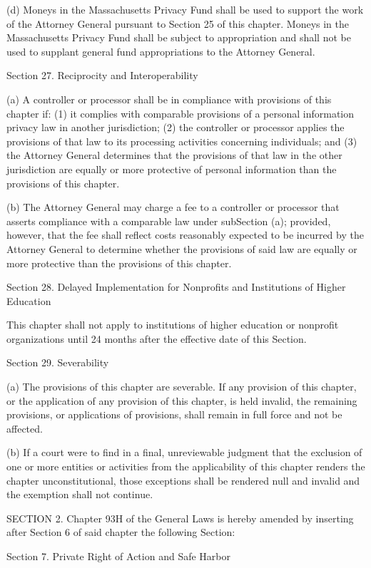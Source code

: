 (d) Moneys in the Massachusetts Privacy Fund shall be used to support the work of the Attorney General pursuant to Section 25 of this chapter. Moneys in the Massachusetts Privacy Fund shall be subject to appropriation and shall not be used to supplant general fund appropriations to the Attorney General.

Section 27. Reciprocity and Interoperability

(a) A controller or processor shall be in compliance with provisions of this chapter if: (1) it complies with comparable provisions of a personal information privacy law in another jurisdiction; (2) the controller or processor applies the provisions of that law to its processing activities concerning individuals; and (3) the Attorney General determines that the provisions of that law in the other jurisdiction are equally or more protective of personal information than the provisions of this chapter.

(b) The Attorney General may charge a fee to a controller or processor that asserts compliance with a comparable law under subSection (a); provided, however, that the fee shall reflect costs reasonably expected to be incurred by the Attorney General to determine whether the provisions of said law are equally or more protective than the provisions of this chapter.

Section 28. Delayed Implementation for Nonprofits and Institutions of Higher Education

This chapter shall not apply to institutions of higher education or nonprofit organizations until 24 months after the effective date of this Section.

Section 29. Severability

(a) The provisions of this chapter are severable. If any provision of this chapter, or the application of any provision of this chapter, is held invalid, the remaining provisions, or applications of provisions, shall remain in full force and not be affected.

(b) If a court were to find in a final, unreviewable judgment that the exclusion of one or more entities or activities from the applicability of this chapter renders the chapter unconstitutional, those exceptions shall be rendered null and invalid and the exemption shall not continue.

SECTION 2. Chapter 93H of the General Laws is hereby amended by inserting after Section 6 of said chapter the following Section:

Section 7. Private Right of Action and Safe Harbor

